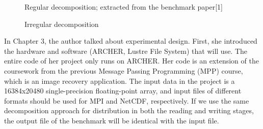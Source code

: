 \documentclass{article}
\begin{document}
\begin{figure}[h]
\centering
\begin{minipage}[t]{0.8\textwidth}
\centering
{}
\caption{Regular decomposition; extracted from the benchmark paper[1]}
\end{minipage}
\begin{minipage}[t]{0.8\textwidth}
\centering
{}
\caption{Irregular decomposition}
\end{minipage}
\end{figure}

In Chapter 3, the author talked about experimental design. First, she introduced the hardware and software (ARCHER, Lustre File System) that will use. The entire code of her project only runs on ARCHER. Her code is an extension of the coursework from the previous Message Passing Programming (MPP) course, which is an image recovery application.
The input data in the project is a 16384x20480 single-precision floating-point array, and input files of different formats should be used for MPI and NetCDF, respectively. If we use the same decomposition approach for distribution in both the reading and writing stages, the output file of the benchmark will be identical with the input file.
\end{document}
